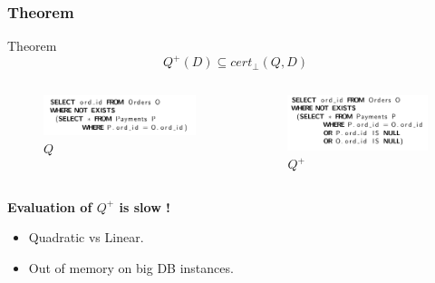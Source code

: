 \documentclass{beamer}
\begin{document}
		\begin{frame}
			\frametitle{Theorem}
			\begin{block}{Theorem}
				$$Q^+(D) \subseteq cert_\bot(Q,D)$$
			\end{block}
			\pause
			\begin{columns}
				\begin{column}{0.48\textwidth}
					\begin{figure}
						\includegraphics[scale=0.42]{q}
						\caption{$Q$}
					\end{figure}
				\end{column}
				\begin{column}{0.48\textwidth}
					\begin{figure}
						\includegraphics[scale=0.43]{rq}
						\caption{$Q^+$}
					\end{figure}
				\end{column}
			\end{columns}
			\pause
			\textbf{Evaluation of $Q^+$ is slow !}
				\begin{itemize}
					\item Quadratic vs Linear.
					\item Out of memory on big DB instances.
				\end{itemize}
				\bigskip
		\end{frame}
		
\end{document}
